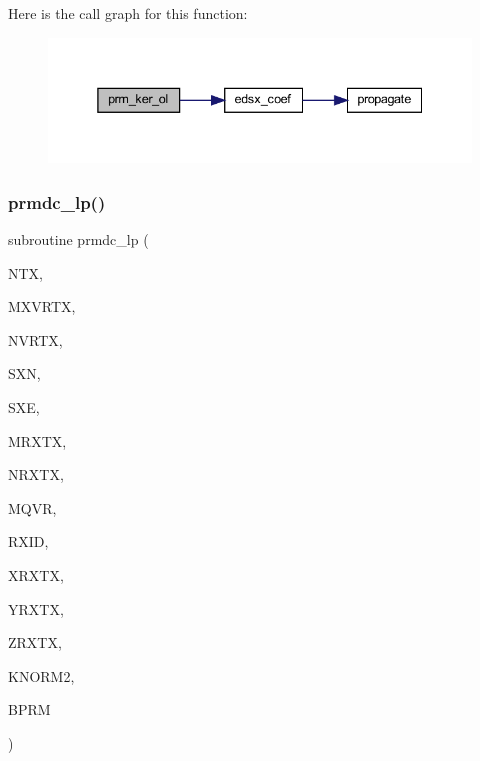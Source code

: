 Here is the call graph for this function\+:\nopagebreak
\begin{figure}[H]
\begin{center}
\leavevmode
\includegraphics[width=338pt]{Leroi__c_8f90_a5a775b5fbe7ca4b27ec968d5efde2795_cgraph}
\end{center}
\end{figure}
\mbox{\label{Leroi__c_8f90_a2332afca7e33269a0f374989bededf94}} 
\subsubsection{\texorpdfstring{prmdc\+\_\+lp()}{prmdc\_lp()}}
{\footnotesize\ttfamily subroutine prmdc\+\_\+lp (\begin{DoxyParamCaption}\item[{integer}]{N\+TX,  }\item[{integer}]{M\+X\+V\+R\+TX,  }\item[{integer, dimension(ntx)}]{N\+V\+R\+TX,  }\item[{real, dimension (mxvrtx,ntx)}]{S\+XN,  }\item[{real, dimension (mxvrtx,ntx)}]{S\+XE,  }\item[{integer}]{M\+R\+X\+TX,  }\item[{integer, dimension(ntx)}]{N\+R\+X\+TX,  }\item[{integer}]{M\+Q\+VR,  }\item[{integer, dimension(mrxtx,ntx)}]{R\+X\+ID,  }\item[{real, dimension (mrxtx,ntx,mqvr)}]{X\+R\+X\+TX,  }\item[{real, dimension (mrxtx,ntx,mqvr)}]{Y\+R\+X\+TX,  }\item[{real, dimension(mrxtx,ntx)}]{Z\+R\+X\+TX,  }\item[{integer, dimension(mrxtx,ntx)}]{K\+N\+O\+R\+M2,  }\item[{real, dimension(mrxtx,ntx)}]{B\+P\+RM }\end{DoxyParamCaption})}

